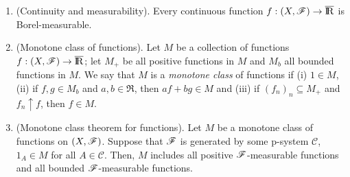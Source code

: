 \documentclass[a4paper,10pt]{article}
\begin{document}
\begin{enumerate}
 \item (Continuity and measurability). Every continuous function $f:(X,\F)\to\barre$ is Borel-measurable. 
  
 \item (Monotone class of functions). Let $M$ be a collection of functions $f:(X,\F)\to\barre$; let $M_+$
       be all positive functions in $M$ and $M_b$ all bounded functions in $M$. We say that $M$ is a \textit{monotone class}
       of functions if (i) $1\in M$, (ii) if $f,g\in M_b$ and $a,b\in \Re$, then $af+bg\in M$ and (iii)
       if $(f_n)_n\subseteq M_+$ and $f_n \uparrow f$, then $f\in M$.
       
 \item (Monotone class theorem for functions). Let $M$ be a monotone class of functions on $(X,\mathscr{F})$. Suppose 
       that $\mathscr{F}$ is generated by some p-system $\mathcal{C}$, $1_A \in M$ for all $A\in\mathcal{C}$.
       Then, $M$ includes all positive $\mathscr{F}$-measurable functions and all bounded $\mathscr{F}$-measurable functions. 
\end{enumerate}
\end{document}
